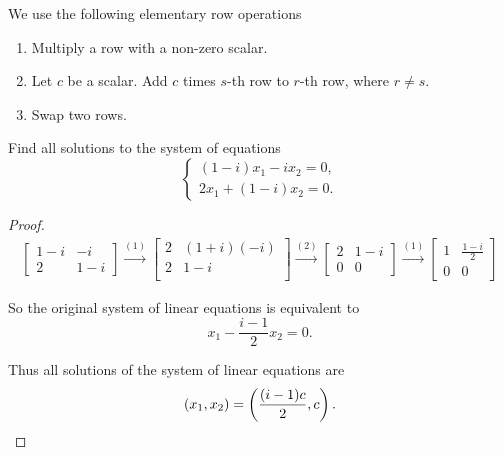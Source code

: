 We use the following elementary row operations
\begin{enumerate}[label={(\arabic*)\ =}]
    \item Multiply a row with a non-zero scalar.
    \item Let $c$ be a scalar. Add $c$ times $s$-th row to $r$-th row, where $r\ne s$.
    \item Swap two rows.
\end{enumerate}

\begin{exercise}
    Find all solutions to the system of equations
    \[
        \begin{cases}
            (1 - i)x_{1} - i x_{2} = 0, \\
            2x_{1} + (1 - i) x_{2} = 0.
        \end{cases}
    \]
\end{exercise}

\begin{proof}
    \begingroup{}
    \allowdisplaybreaks{}
    \begin{align*}
        \begin{bmatrix}
            1 - i & -i    \\
            2     & 1 - i
        \end{bmatrix}
        \stackrel{(1)}{\rightarrow}
        \begin{bmatrix}
            2 & (1 + i)(-i) \\
            2 & 1 - i       \\
        \end{bmatrix}
        \stackrel{(2)}{\rightarrow}
        \begin{bmatrix}
            2 & 1 - i \\
            0 & 0
        \end{bmatrix}
        \stackrel{(1)}{\rightarrow}
        \begin{bmatrix}
            1 & \frac{1 - i}{2} \\
            0 & 0
        \end{bmatrix}
    \end{align*}
    \endgroup{}

    So the original system of linear equations is equivalent to
    \[
        x_{1} - \frac{i - 1}{2}x_{2} = 0.
    \]

    Thus all solutions of the system of linear equations are
    \[
        (x_{1}, x_{2}) = \left( \frac{(i - 1)c}{2}, c \right).\qedhere
    \]
\end{proof}

